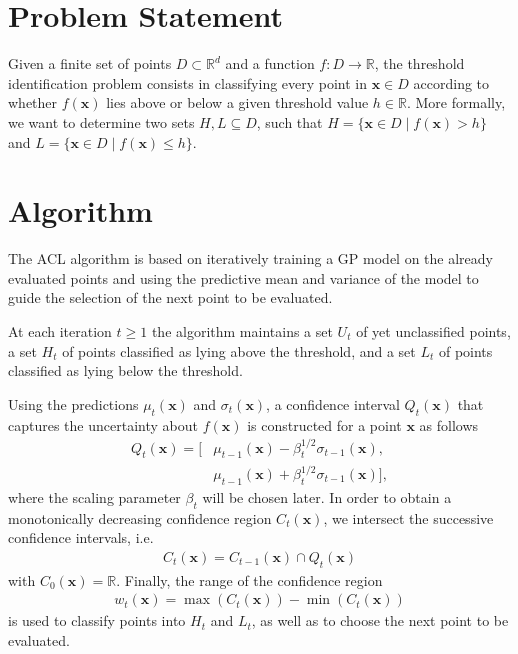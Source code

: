 \documentclass{article}
\def\*#1{\bm{#1}}
\begin{document}
 



\section{Problem Statement}
Given a finite set of points $D \subset \mathbb{R}^d$ and a function
${f : D \to \mathbb{R}}$, the threshold identification problem consists in
classifying every point in $\*x \in D$ according to whether $f(\*x)$ lies
above or below a given threshold
value $h\in \mathbb{R}$. More formally, we want to determine two sets
$H, L \subseteq D$, such that
$H = \{\*x \in D \mid f(\*x) > h\}$ and $L = \{\*x \in D \mid f(\*x) \leq h\}$.

\section{Algorithm}
The ACL algorithm is based on iteratively training a GP model on the
already evaluated points and using the predictive mean and variance of the
model to guide the selection of the next point to be evaluated.

At each iteration $t \geq 1$ the algorithm maintains a set $U_t$ of yet
unclassified points, a set $H_t$ of points classified as lying above
the threshold, and a set $L_t$ of points classified as lying below the
threshold.

Using the predictions $\mu_t(\*x)$ and $\sigma_t(\*x)$, a confidence
interval $Q_t(\*x)$ that captures the uncertainty about $f(\*x)$ is constructed
for a point $\*x$ as follows
\begin{align*}
Q_t(\*x) = [&\mu_{t-1}(\*x) - \beta_t^{1/2}\sigma_{t-1}(\*x),\\
            &\mu_{t-1}(\*x) + \beta_t^{1/2}\sigma_{t-1}(\*x)],
\end{align*}
where the scaling parameter $\beta_t$ will be chosen later.
In order to obtain a monotonically decreasing confidence region $C_t(\*x)$,
we intersect the successive confidence intervals, i.e.
\begin{align*}
C_t(\*x) = C_{t-1}(\*x) \cap Q_t(\*x)
\end{align*}
with $C_0(\*x) = \mathbb{R}$.
Finally, the range of the confidence region
\begin{align*}
w_t(\*x) = \max(C_t(\*x)) - \min(C_t(\*x))
\end{align*}
is used to classify points into $H_t$ and $L_t$, as well as to choose
the next point to be evaluated.
\end{document}
